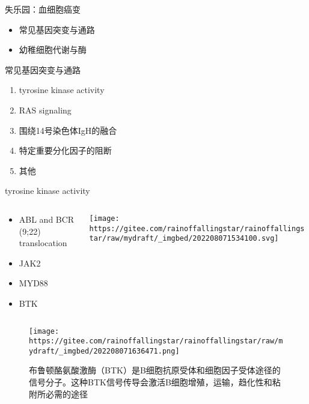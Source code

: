 \documentclass[
  ignorenonframetext,
]{beamer}
\providecommand{\tightlist}{%
  \setlength{\itemsep}{0pt}\setlength{\parskip}{0pt}}
\begin{document}
\begin{frame}{失乐园：血细胞癌变}
\protect\hypertarget{ux5931ux4e50ux56edux8840ux7ec6ux80deux764cux53d8}{}
\begin{itemize}
\tightlist
\item
  常见基因突变与通路
\item
  幼稚细胞代谢与酶
\end{itemize}
\end{frame}

\begin{frame}
\begin{block}{常见基因突变与通路}
\protect\hypertarget{ux5e38ux89c1ux57faux56e0ux7a81ux53d8ux4e0eux901aux8def}{}
\begin{enumerate}
\item
  tyrosine kinase activity
\item
  RAS signaling
\item
  围绕14号染色体IgH的融合
\item
  特定重要分化因子的阻断
\item
  其他
\end{enumerate}
\end{block}
\end{frame}

\begin{frame}
\begin{block}{tyrosine kinase activity}
\protect\hypertarget{tyrosine-kinase-activity}{}
\begin{columns}[T]
\begin{column}{0.4\textwidth}
\begin{itemize}
\item
  ABL and BCR (9;22) translocation
\item
  JAK2
\item
  MYD88
\item
  BTK
\end{itemize}
\end{column}

\begin{column}{0.6\textwidth}
\texttt{[image: https://gitee.com/rainoffallingstar/rainoffallingstar/raw/mydraft/\_imgbed/202208071534100.svg]}
\end{column}
\end{columns}
\end{block}
\end{frame}

\begin{frame}
\begin{figure}
\centering
\texttt{[image: https://gitee.com/rainoffallingstar/rainoffallingstar/raw/mydraft/\_imgbed/202208071636471.png]}
\caption{布鲁顿酪氨酸激酶（BTK）是B细胞抗原受体和细胞因子受体途径的信号分子。这种BTK信号传导会激活B细胞增殖，运输，趋化性和粘附所必需的途径}
\end{figure}
\end{frame}
\end{document}
